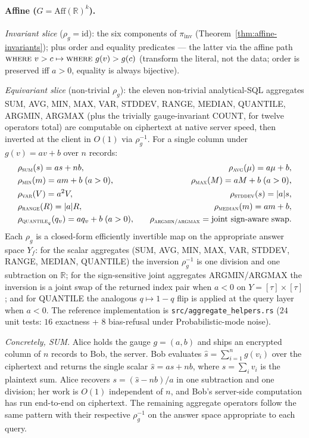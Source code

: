\documentclass[11pt,letterpaper]{article}
\begin{document}
\paragraph{Affine ($G = \mathrm{Aff}(\mathbb{R})^k$).}
\emph{Invariant slice} ($\rho_g = \mathrm{id}$): the six
components of $\pi_{\mathrm{inv}}$
(Theorem~\ref{thm:affine-invariants}); plus order and equality
predicates --- the latter via the affine path
$\textsc{where}\ v > c \mapsto \textsc{where}\ g(v) > g(c)$
(transform the literal, not the data; order is preserved iff $a > 0$,
equality is always bijective).
\smallskip

\noindent
\emph{Equivariant slice} (non-trivial $\rho_g$): the eleven
non-trivial analytical-SQL aggregates SUM, AVG, MIN, MAX, VAR,
STDDEV, RANGE, MEDIAN, QUANTILE, ARGMIN, ARGMAX (plus the
trivially gauge-invariant COUNT, for twelve operators total) are
computable on ciphertext at native server speed, then
inverted at the client in $O(1)$ via $\rho_g^{-1}$. For a single
column under $g(v) = a v + b$ over $n$ records:
\[
\begin{aligned}
&\rho_{\textsc{sum}}(s) = a s + n b,
\quad
&\rho_{\textsc{avg}}(\mu) = a \mu + b,\\
&\rho_{\textsc{min}}(m) = a m + b \;(a>0),
\quad
&\rho_{\textsc{max}}(M) = a M + b \;(a>0),\\
&\rho_{\textsc{var}}(V) = a^2 V,
\quad
&\rho_{\textsc{stddev}}(s) = |a| s,\\
&\rho_{\textsc{range}}(R) = |a| R,
\quad
&\rho_{\textsc{median}}(m) = a m + b,\\
&\rho_{\textsc{quantile}_q}(q_v) = a q_v + b \;(a>0),
\quad
&\rho_{\textsc{argmin/argmax}} = \text{joint sign-aware swap}.
\end{aligned}
\]
Each $\rho_g$ is a closed-form efficiently invertible map on
the appropriate answer space $Y_f$: for the scalar aggregates
(SUM, AVG, MIN, MAX, VAR, STDDEV, RANGE, MEDIAN, QUANTILE) the
inversion $\rho_g^{-1}$ is one division and one subtraction on
$\mathbb{R}$; for the sign-sensitive joint aggregates
ARGMIN/ARGMAX the inversion is a joint swap of the returned
index pair when $a < 0$ on $Y = [\tau] \times [\tau]$; and for
QUANTILE the analogous $q \mapsto 1 - q$ flip is applied at the
query layer when $a < 0$.
The reference implementation is
\texttt{src/aggregate\_helpers.rs} ($24$ unit tests: $16$ exactness
+ $8$ bias-refusal under Probabilistic-mode noise).

\emph{Concretely, SUM.}
Alice holds the gauge $g = (a, b)$ and ships an encrypted column
of $n$ records to Bob, the server. Bob evaluates
$\hat{s} = \sum_{i=1}^n g(v_i)$ over the ciphertext and returns
the single scalar $\hat{s} = a s + n b$, where
$s = \sum_i v_i$ is the plaintext sum. Alice recovers
$s = (\hat{s} - n b)/a$ in one subtraction and one division;
her work is $O(1)$ independent of $n$, and Bob's server-side
computation has run end-to-end on ciphertext. The remaining
aggregate operators follow the same pattern with their
respective $\rho_g^{-1}$ on the answer space appropriate to
each query.
\end{document}
